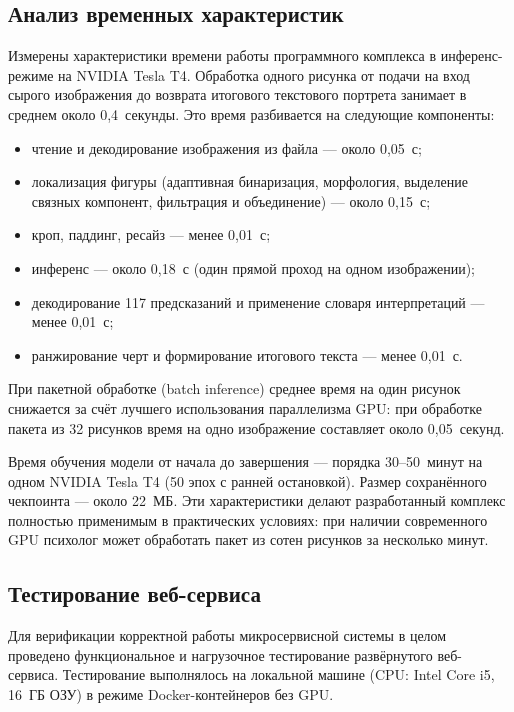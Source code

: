 \FloatBarrier
\subsection{Анализ временных характеристик}

Измерены характеристики времени работы программного комплекса в инференс-режиме на NVIDIA Tesla T4. Обработка одного рисунка от подачи на вход сырого изображения до возврата итогового текстового портрета занимает в среднем около 0,4~секунды. Это время разбивается на следующие компоненты:

\begin{itemize}
    \item чтение и декодирование изображения из файла --- около 0,05~с;
    \item локализация фигуры (адаптивная бинаризация, морфология, выделение связных компонент, фильтрация и объединение) --- около 0,15~с;
    \item кроп, паддинг, ресайз --- менее 0,01~с;
    \item инференс --- около 0,18~с (один прямой проход на одном изображении);
    \item декодирование 117 предсказаний и применение словаря интерпретаций --- менее 0,01~с;
    \item ранжирование черт и формирование итогового текста --- менее 0,01~с.
\end{itemize}

При пакетной обработке (batch inference) среднее время на один рисунок снижается за счёт лучшего использования параллелизма GPU: при обработке пакета из 32 рисунков время на одно изображение составляет около 0,05~секунд.

Время обучения модели от начала до завершения --- порядка 30--50~минут на одном NVIDIA Tesla T4 (50 эпох с ранней остановкой). Размер сохранённого чекпоинта --- около 22~МБ. Эти характеристики делают разработанный комплекс полностью применимым в практических условиях: при наличии современного GPU психолог может обработать пакет из сотен рисунков за несколько минут.

\subsection{Тестирование веб-сервиса}

Для верификации корректной работы микросервисной системы в целом проведено функциональное и нагрузочное тестирование развёрнутого веб-сервиса. Тестирование выполнялось на локальной машине (CPU: Intel Core i5, 16~ГБ ОЗУ) в режиме Docker-контейнеров без GPU.

